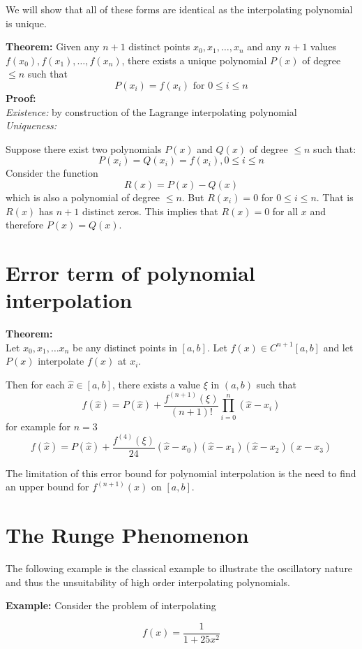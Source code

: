 \documentclass [titlepage,12pt,letter] {article}
\begin{document}
We will show that all of these forms are identical as the interpolating polynomial is unique.  

{\bf Theorem:} Given any $n+1$ distinct points $x_0, x_1, \dots, x_n$ and any $n+1$ values 
$f(x_0), f(x_1), \dots, f(x_n)$, there exists a unique polynomial $P(x)$ of degree $\leq n$ such that 
\[
P(x_i) = f(x_i) \mbox{ for } 0 \leq i \leq n
\]
\noindent 
{\bf Proof:} \\
{\it Existence:} by construction of the Lagrange interpolating polynomial 
\\
{\it Uniqueness:} 

Suppose there exist two polynomials $P(x)$ and $Q(x)$ of degree $\leq n$ such that: 
\[
P(x_i) = Q(x_i) = f(x_i), 0\leq i \leq n 
\]
\noindent 
Consider the function 
\[
R(x) = P(x) - Q(x)
\]
\noindent 
which is also a polynomial of degree $\leq n$. 
But $R(x_i) = 0$ for $0 \leq i \leq n$. That is $R(x)$ has 
$n+1$ distinct zeros. This implies that $R(x) = 0$ for all $x$ 
and therefore $P(x) = Q(x)$. 

\section{Error term of polynomial interpolation} 
\noindent 
{\bf Theorem:} \\ 
Let $x_0, x_1, \dots x_n$ be any distinct points in $[a,b]$. Let $f(x) \in C^{n+1} [a,b]$ and let 
$P(x)$ interpolate $f(x)$ at ${x_i}$. 

Then for each $\hat x \in [a,b]$, there exists a value $\xi$ in $(a,b)$ such that 
\[
f(\hat x) = P(\hat x) + \frac{f^{(n+1)}(\xi)}{(n+1)!} \prod_{i=0}^{n} (\hat x - x_i)
\]
for example for $n=3$ 
\[
f(\hat x) = P(\hat x) + \frac{f^{(4)}(\xi)}{24} (\hat x - x_0)(\hat x - x_1)(\hat x - x_2)(\hat x - x_3)
\]

\noindent 
The limitation of this error bound for polynomial interpolation is the need to find an upper bound for 
$f^{(n+1)}(x)$ on $[a,b]$. 

\section{The Runge Phenomenon}

The following example is the classical example to illustrate the oscillatory nature and thus the unsuitability of high order interpolating polynomials.

{\bf Example:} Consider the problem of interpolating

\[
f(x)= \frac{1}{1+25x^2}
\]
\end{document}
